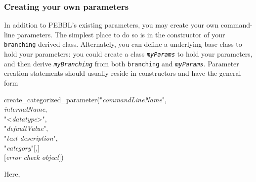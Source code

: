\subsubsection{Creating your own parameters}
\label{sec:ownparams} 
In addition to PEBBL's existing parameters, you may create your own
command-line parameters.  The simplest place to do so is in the
constructor of your \texttt{branching}-derived class.  Alternately,
you can define a underlying base class to hold your parameters: you
could create a class \texttt{\emph{myParams}} to hold your parameters,
and then derive \texttt{\emph{myBranching}} from both
\texttt{branching} and \texttt{\emph{myParams}}.  Parameter creation
statements should usually reside in constructors and have the general
form
\begin{codeblock}
create\_categorized\_parameter(\="\textrm{\emph{commandLineName}}",\\
\>\textrm{\emph{internalName}},\\
\>"<\textrm{\emph{datatype}}>",\\
\>"\textrm{\emph{defaultValue}}",\\
\>"\textrm{\emph{text description}}",\\
\>"\textrm{\emph{category}}"\textrm{[},\textrm{]}\\
\>\textrm{[\emph{error check object}]})
\end{codeblock}
Here,
